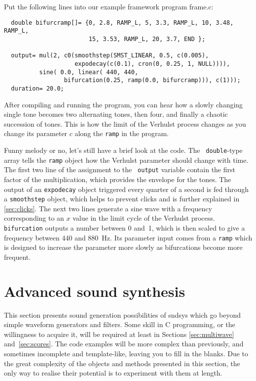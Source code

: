 \documentclass{article}
\def\s{{\sc sndsys} }
\def\bv{\begin{verbatim}}
\begin{document}
Put the following lines into our example framework program frame.c:

\bv
  double bifurcramp[]= {0, 2.8, RAMP_L, 5, 3.3, RAMP_L, 10, 3.48, RAMP_L,
                        15, 3.53, RAMP_L, 20, 3.7, END };

  output= mul(2, c0(smoothstep(SMST_LINEAR, 0.5, c(0.005), 
                    expodecay(c(0.1), cron(0, 0.25, 1, NULL)))),
          sine( 0.0, linear( 440, 440, 
	             bifurcation(0.25, ramp(0.0, bifurcramp))), c(1)));
  duration= 20.0;
\end{verbatim}

After compiling and running the program, you can hear how a slowly changing
single tone becomes two alternating tones, then four, and finally a chaotic
succession of tones.  This is how the limit of the Verhulst process changes as
you change its parameter $c$ along the {\tt ramp} in the program.

Funny melody or no, let's still have a brief look at the code.  The {\tt
double}-type array tells the {\tt ramp} object how the Verhulst parameter
should change with time.  The first two line of the assignment to the {\tt
output} variable contain the first factor of the multiplication, which provides
the envelope for the tones.  The output of an {\tt expodecay} object triggered
every quarter of a second is fed through a {\tt smoothstep} object, which helps
to prevent clicks and is further explained in \autoref{sec:clicks}.  The next
two lines generate a sine wave with a frequency corresponding to an $x$ value
in the limit cycle of the Verhulst process.  {\tt bifurcation} outputs a number
between 0 and~1, which is then scaled to give a frequency between 440 and
880~Hz.  Its parameter input comes from a {\tt ramp} which is designed to
increase the parameter more slowly as bifurcations become more frequent.




\section{Advanced sound synthesis}

This section presents sound generation possibilities of \s which go beyond
simple waveform generators and filters.  Some skill in C programming, or the
willingness to acquire it, will be required at least in Sections
\ref{sec:multiwave} and~\ref{sec:scores}.  The code examples will be more
complex than previously, and sometimes incomplete and template-like, leaving
you to fill in the blanks.  Due to the great complexity of the objects and
methods presented in this section, the only way to realise their potential is
to experiment with them at length.
\end{document}
